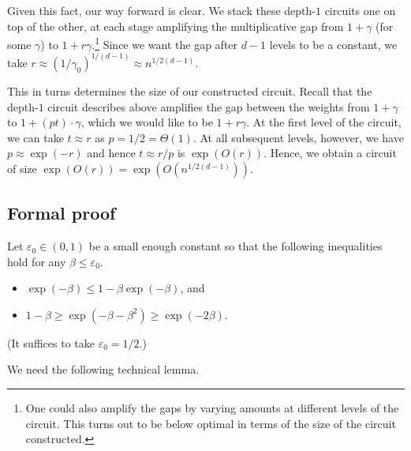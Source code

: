 \documentclass{toc}
\begin{document}
Given this fact, our way forward is clear. We stack these depth-$1$ circuits one on top of the other, at each stage amplifying the multiplicative gap from $1+\gamma$ (for some $\gamma$) to $1+r\gamma$.\footnote{One could also amplify the gaps by varying amounts at different levels of the circuit. This turns out to be %
%
%
below optimal 
in terms of the size of the circuit constructed.} Since we want the gap after $d-1$ levels to be a constant, we take $r \approx (1/\gamma_0)^{1/(d-1)} \approx n^{1/2(d-1)}$.

This in turns determines the size of our constructed circuit. Recall that the depth-$1$ circuit describes above amplifies the gap between the weights from $1+\gamma$ to $1+(pt)\cdot \gamma$, which we would like to be $1+r\gamma$. At the first level of the circuit, we can take $t\approx r$ as $p = 1/2 = \Theta(1)$. At all subsequent levels, however, we have $p\approx \exp(-r)$ and hence $t \approx r/p$ is $\exp(O(r))$. Hence, we obtain a circuit of size $\exp(O(r)) = \exp(O(n^{1/2(d-1)}))$.


\subsection{Formal proof}

Let $\varepsilon_0\in (0,1)$ be a small enough constant so that the following inequalities hold for any $\beta \leq \varepsilon_0$.
\begin{itemize}
\item $\exp(-\beta) \leq 1-\beta\exp(-\beta)$, and
\item $1-\beta \geq \exp(-\beta-\beta^2)\geq \exp(-2\beta)$.
\end{itemize}
(It suffices to take $\varepsilon_0 = 1/2$.) 

We need the following technical lemma.
\end{document}
